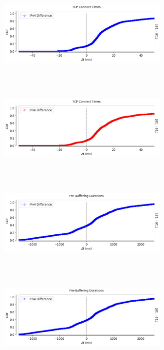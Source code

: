 \begin{figure}
	\centering
	\begin{minipage}{0.5\textwidth}
		\centering
		\includegraphics[keepaspectratio, height=5cm, width=8.5cm]{figures/cache/bskyb/netflix-syn-diff-5607-cdf-v4.pdf}
	\end{minipage}
	\begin{minipage}{0.5\textwidth}
		\centering
		\includegraphics[keepaspectratio, height=5cm, width=8.5cm]{figures/cache/bskyb/netflix-syn-diff-5607-cdf-v6.pdf}
	\end{minipage}
	\begin{minipage}{0.5\textwidth}
		\centering
		\includegraphics[keepaspectratio, height=5cm, width=8.5cm]{figures/cache/bskyb/netflix-pd-diff-5607-cdf-v4.pdf}
	\end{minipage}
	\begin{minipage}{0.5\textwidth}
		\centering
		\includegraphics[keepaspectratio, height=5cm, width=8.5cm]{figures/cache/bskyb/netflix-pd-diff-5607-cdf-v4.pdf}

\end{minipage}
\end{figure}
